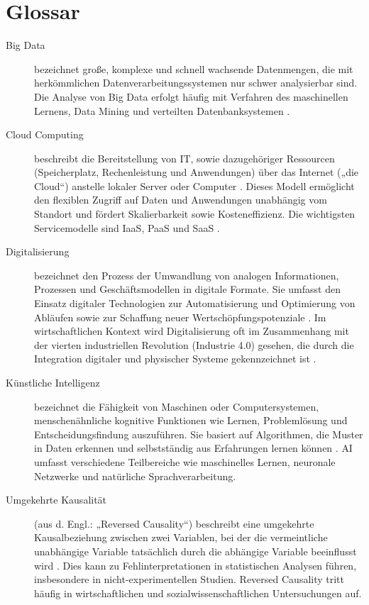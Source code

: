 \documentclass[a4paper, 12pt]{article}
\begin{document}
\section*{Glossar}
\begin{description}

  \item[Big Data] bezeichnet große, komplexe und schnell wachsende Datenmengen, die mit 
  herkömmlichen Datenverarbeitungssystemen nur schwer analysierbar sind. Die Analyse von Big Data 
  erfolgt häufig mit Verfahren des maschinellen Lernens, Data Mining und verteilten 
  Datenbanksystemen \parencite[vgl.][S. 138–139]{gandomi2014beyond}.

  \item[Cloud Computing] beschreibt die Bereitstellung von \ac{IT}, sowie dazugehöriger 
  Ressourcen (Speicherplatz, Rechenleistung und Anwendungen) über das Internet („die Cloud“) 
  anstelle lokaler Server oder Computer \parencite[vgl.][S. 50–52]{armbrust2010aview}. Dieses 
  Modell ermöglicht den flexiblen Zugriff auf Daten und Anwendungen unabhängig vom Standort und 
  fördert Skalierbarkeit sowie Kosteneffizienz. Die wichtigsten Servicemodelle sind \ac{IaaS}, 
  \ac{PaaS} und \ac{SaaS} \parencite[vgl.][S. 50]{armbrust2010aview}.

  \item[Digitalisierung] bezeichnet den Prozess der Umwandlung von analogen Informationen, 
  Prozessen und Geschäftsmodellen in digitale Formate. Sie umfasst den Einsatz digitaler 
  Technologien zur Automatisierung und Optimierung von Abläufen sowie zur Schaffung neuer 
  Wertschöpfungspotenziale \parencite[vgl.][S. 6]{brennen2016theinternational}. Im 
  wirtschaftlichen Kontext wird Digitalisierung oft im Zusammenhang mit der vierten industriellen 
  Revolution (Industrie 4.0) gesehen, die durch die Integration digitaler und physischer Systeme 
  gekennzeichnet ist \parencite[vgl.][S. 113–115]{hofman2018arbeit}.

  \item[Künstliche Intelligenz] bezeichnet die Fähigkeit von Maschinen oder Computersystemen, 
  menschenähnliche kognitive Funktionen wie Lernen, Problemlösung und Entscheidungsfindung 
  auszuführen. Sie basiert auf Algorithmen, die Muster in Daten erkennen und selbstständig aus 
  Erfahrungen lernen können \parencite[vgl.][S. 10–13]{russell2020artificial}. \ac{AI} umfasst 
  verschiedene Teilbereiche wie maschinelles Lernen, neuronale Netzwerke und natürliche 
  Sprachverarbeitung.

  \item[Umgekehrte Kausalität] (aus d. Engl.: „Reversed Causality“) beschreibt eine umgekehrte 
  Kausalbeziehung zwischen zwei Variablen, bei der die vermeintliche unabhängige Variable 
  tatsächlich durch die abhängige Variable beeinflusst wird 
  \parencite[vgl.][S. 159–160]{pearl2009causality}. Dies kann zu Fehlinterpretationen in 
  statistischen Analysen führen, insbesondere in nicht-experimentellen Studien. Reversed 
  Causality tritt häufig in wirtschaftlichen und sozialwissenschaftlichen Untersuchungen auf.

\end{description}
\end{document}
